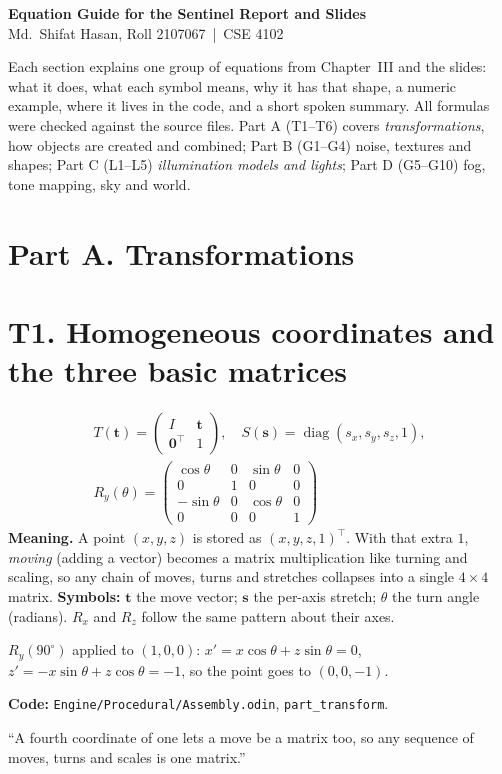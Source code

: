 \documentclass[11pt,a4paper]{article}
\newcommand{\code}[1]{{\small\texttt{#1}}}
\begin{document}
\begin{center}
	{\LARGE\bfseries Equation Guide for the Sentinel Report and Slides}\\[4pt]
	{\large Md.\ Shifat Hasan, Roll 2107067 \,|\, CSE 4102}
\end{center}

Each section explains one group of equations from Chapter~III and the slides: what it does, what each symbol means, why it has that shape, a numeric example, where it lives in the code, and a short spoken summary. All formulas were checked against the source files. Part A (T1--T6) covers \emph{transformations}, how objects are created and combined; Part B (G1--G4) noise, textures and shapes; Part C (L1--L5) \emph{illumination models and lights}; Part D (G5--G10) fog, tone mapping, sky and world.

\section*{Part A. Transformations}

\section{T1. Homogeneous coordinates and the three basic matrices}
\[\begin{gathered}T(\mathbf t)=\begin{pmatrix}I&\mathbf t\\\mathbf 0^{\top}&1\end{pmatrix},\quad S(\mathbf s)=\operatorname{diag}(s_x,s_y,s_z,1),\\[4pt] R_y(\theta)=\begin{pmatrix}\cos\theta&0&\sin\theta&0\\0&1&0&0\\-\sin\theta&0&\cos\theta&0\\0&0&0&1\end{pmatrix}\end{gathered}\]
\textbf{Meaning.} A point $(x,y,z)$ is stored as $(x,y,z,1)^{\top}$. With that extra $1$, \emph{moving} (adding a vector) becomes a matrix multiplication like turning and scaling, so any chain of moves, turns and stretches collapses into a single $4\times4$ matrix. \textbf{Symbols:} $\mathbf t$ the move vector; $\mathbf s$ the per-axis stretch; $\theta$ the turn angle (radians). $R_x$ and $R_z$ follow the same pattern about their axes.
\begin{ex}$R_y(90^{\circ})$ applied to $(1,0,0)$: $x'=x\cos\theta+z\sin\theta=0$, $z'=-x\sin\theta+z\cos\theta=-1$, so the point goes to $(0,0,-1)$.\end{ex}
\textbf{Code:} \code{Engine/Procedural/Assembly.odin}, \code{part\_transform}.
\begin{say}``A fourth coordinate of one lets a move be a matrix too, so any sequence of moves, turns and scales is one matrix.''\end{say}
\end{document}

